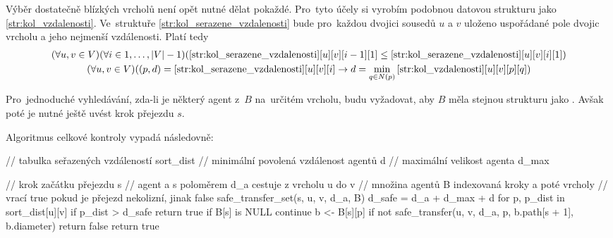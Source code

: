 Výběr dostatečně blízkých vrcholů není opět nutné dělat pokaždé.
Pro~tyto účely si vyrobím podobnou datovou strukturu jako \ref{str:kol_vzdalenosti}.
Ve~struktuře \ref{str:kol_serazene_vzdalenosti}
bude pro~každou dvojici sousedů $u$ a $v$ uloženo uspořádané pole dvojic vrcholu a jeho nejmenší vzdálenosti.
Platí tedy
\begin{gather*}
(\forall u, v \in V)(\forall i \in {1, \dots, |V| - 1})(\ref{str:kol_serazene_vzdalenosti}[u][v][i - 1][1] \leq
\ref{str:kol_serazene_vzdalenosti}[u][v][i][1])
	\\
	(\forall u, v \in V)((p, d) = \ref{str:kol_serazene_vzdalenosti}[u][v][i] \rightarrow
	d = \min_{q \in N(p)}\ref{str:kol_vzdalenosti}[u][v][p][q])
\end{gather*}

Pro~jednoduché vyhledávání, zda-li je některý agent z~$B$ na~určitém vrcholu, budu vyžadovat,
aby $B$ měla stejnou strukturu jako .
Avšak poté je nutné ještě uvést krok přejezdu $s$.

Algoritmus celkové kontroly vypadá následovně:
\begin{code}[fontsize=\footnotesize]
// tabulka seřazených vzdáleností sort_dist
// minimální povolená vzdálenost agentů d
// maximální velikost agenta d_max

// krok začátku přejezdu s
// agent a s poloměrem d_a cestuje z vrcholu u do v
// množina agentů B indexovaná kroky a poté vrcholy
// vrací true pokud je přejezd nekolizní, jinak false
safe_transfer_set(s, u, v, d_a, B)
	d_safe = d_a + d_max + d
	for p, p_dist in sort_dist[u][v]
		if p_dist > d_safe
			return true
		if B[s] is NULL
			continue
		b <- B[s][p]
		if not safe_transfer(u, v, d_a, p, b.path[s + 1], b.diameter)
			return false
	return true
\end{code}
